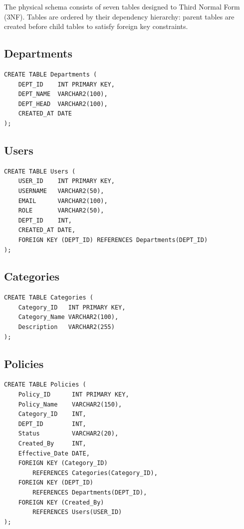 \documentclass[conference]{IEEEtran}
\begin{document}
The physical schema consists of seven tables designed to Third Normal Form (3NF). Tables are ordered by their dependency hierarchy: parent tables are created before child tables to satisfy foreign key constraints.

\subsection{Departments}
\begin{lstlisting}[style=sqlstyle, caption={DDL: Departments table}]
CREATE TABLE Departments (
    DEPT_ID    INT PRIMARY KEY,
    DEPT_NAME  VARCHAR2(100),
    DEPT_HEAD  VARCHAR2(100),
    CREATED_AT DATE
);
\end{lstlisting}

\subsection{Users}
\begin{lstlisting}[style=sqlstyle, caption={DDL: Users table}]
CREATE TABLE Users (
    USER_ID    INT PRIMARY KEY,
    USERNAME   VARCHAR2(50),
    EMAIL      VARCHAR2(100),
    ROLE       VARCHAR2(50),
    DEPT_ID    INT,
    CREATED_AT DATE,
    FOREIGN KEY (DEPT_ID) REFERENCES Departments(DEPT_ID)
);
\end{lstlisting}

\subsection{Categories}
\begin{lstlisting}[style=sqlstyle, caption={DDL: Categories table}]
CREATE TABLE Categories (
    Category_ID   INT PRIMARY KEY,
    Category_Name VARCHAR2(100),
    Description   VARCHAR2(255)
);
\end{lstlisting}

\subsection{Policies}
\begin{lstlisting}[style=sqlstyle, caption={DDL: Policies table}]
CREATE TABLE Policies (
    Policy_ID      INT PRIMARY KEY,
    Policy_Name    VARCHAR2(150),
    Category_ID    INT,
    DEPT_ID        INT,
    Status         VARCHAR2(20),
    Created_By     INT,
    Effective_Date DATE,
    FOREIGN KEY (Category_ID)
        REFERENCES Categories(Category_ID),
    FOREIGN KEY (DEPT_ID)
        REFERENCES Departments(DEPT_ID),
    FOREIGN KEY (Created_By)
        REFERENCES Users(USER_ID)
);
\end{lstlisting}
\end{document}
